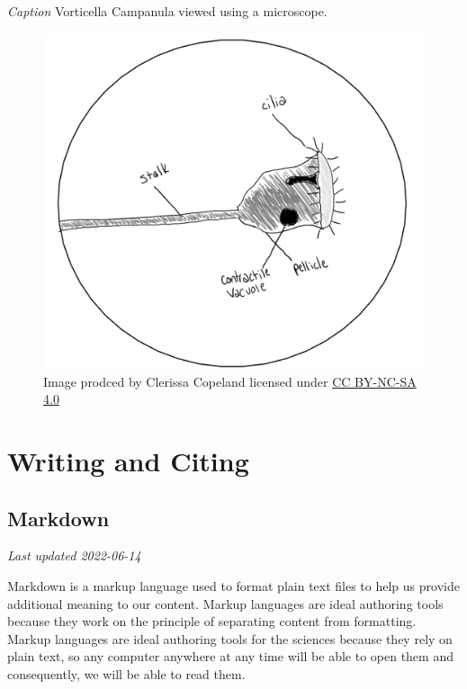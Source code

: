 \documentclass[
]{book}
\begin{document}
\emph{Caption} Vorticella Campanula viewed using a microscope.

\begin{figure}
\centering
\includegraphics{images/JSSG_poor-journal-style-fig-1.png}
\caption{Image prodced by Clerissa Copeland licensed under \href{https://creativecommons.org/licenses/by-nc-sa/4.0/}{CC BY-NC-SA 4.0}}
\end{figure}

\hypertarget{part-writing-and-citing}{%
\part*{Writing and Citing}\label{part-writing-and-citing}}

\hypertarget{markdown-1}{%
\chapter{Markdown}\label{markdown-1}}

\emph{Last updated 2022-06-14}

Markdown is a markup language used to format plain text files to help us provide additional meaning to our content. Markup languages are ideal authoring tools because they work on the principle of separating content from formatting. Markup languages are ideal authoring tools for the sciences because they rely on plain text, so any computer anywhere at any time will be able to open them and consequently, we will be able to read them.
\end{document}
